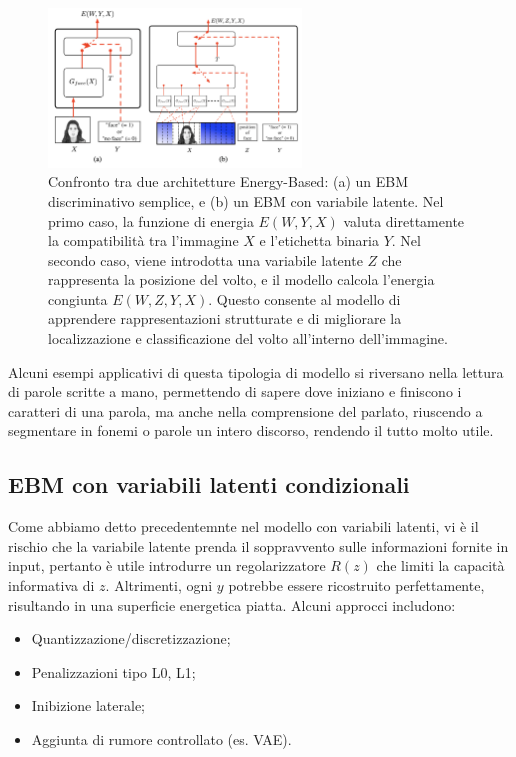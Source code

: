 \begin{figure}
    \centering
    \includegraphics[width=0.6\textwidth]{figure/ebm-face.png}
    \caption{Confronto tra due architetture Energy-Based: (a) un EBM discriminativo semplice, e (b) un EBM con variabile latente. 
    Nel primo caso, la funzione di energia $E(W, Y, X)$ valuta direttamente la compatibilità tra l'immagine $X$ e l'etichetta binaria $Y$. Nel secondo caso, viene introdotta una variabile latente $Z$ che rappresenta la posizione del volto, e il modello calcola l'energia congiunta $E(W, Z, Y, X)$. Questo consente al modello di apprendere rappresentazioni strutturate e di migliorare la localizzazione e classificazione del volto all'interno dell'immagine.}
    \label{fig:ebm-face}
\end{figure}

Alcuni esempi applicativi di questa tipologia di modello si riversano nella lettura di parole scritte a mano, permettendo di sapere dove iniziano e finiscono i caratteri di una parola, ma anche nella comprensione del parlato, riuscendo a segmentare in fonemi o parole un intero discorso, rendendo il tutto molto utile.

\subsection{EBM con variabili latenti condizionali}
Come abbiamo detto precedentemnte nel modello con variabili latenti, vi è il rischio che la variabile latente prenda il soppravvento sulle informazioni fornite in input, pertanto è utile introdurre un regolarizzatore $R(z)$ che limiti la capacità informativa di $z$. Altrimenti, ogni $y$ potrebbe essere ricostruito perfettamente, risultando in una superficie energetica piatta. Alcuni approcci includono:
\begin{itemize}
    \item Quantizzazione/discretizzazione;
    \item Penalizzazioni tipo L0, L1;
    \item Inibizione laterale;
    \item Aggiunta di rumore controllato (es. VAE).
\end{itemize}

